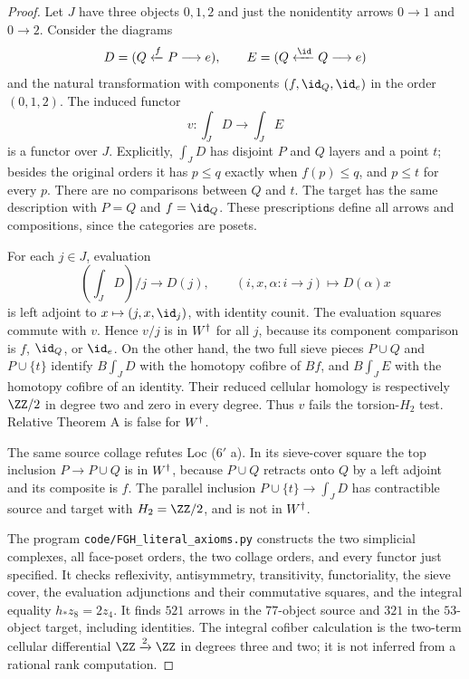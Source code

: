 \begin{proof}
Let $J$ have three objects $0,1,2$ and just the nonidentity arrows $0\to1$ and $0\to2$. Consider the diagrams
\[
 D=(Q\xleftarrow{f}P\longrightarrow e),
 \qquad E=(Q\xleftarrow{\id}Q\longrightarrow e)
\]
and the natural transformation with components $(f,\id_Q,\id_e)$ in the order $(0,1,2)$. The induced functor
\[
 v:\int_J D\longrightarrow\int_J E
\]
is a functor over $J$. Explicitly, $\int_JD$ has disjoint $P$ and $Q$ layers and a point $t$; besides the original orders it has $p\leq q$ exactly when $f(p)\leq q$, and $p\leq t$ for every $p$. There are no comparisons between $Q$ and $t$. The target has the same description with $P=Q$ and $f=\id_Q$. These prescriptions define all arrows and compositions, since the categories are posets.

For each $j\in J$, evaluation
\[
 (\int_JD)/j\longrightarrow D(j),
 \qquad (i,x,\alpha:i\to j)\longmapsto D(\alpha)x
\]
is left adjoint to $x\mapsto(j,x,\id_j)$, with identity counit. The evaluation squares commute with $v$. Hence $v/j$ is in ${W^{\dagger}}$ for all $j$, because its component comparison is $f$, $\id_Q$, or $\id_e$. On the other hand, the two full sieve pieces $P\cup Q$ and $P\cup\{t\}$ identify $B\int_JD$ with the homotopy cofibre of $Bf$, and $B\int_JE$ with the homotopy cofibre of an identity. Their reduced cellular homology is respectively $\ZZ/2$ in degree two and zero in every degree. Thus $v$ fails the torsion-$H_2$ test. Relative Theorem A is false for ${W^{\dagger}}$.

The same source collage refutes Loc ($6'$ a). In its sieve-cover square the top inclusion $P\to P\cup Q$ is in ${W^{\dagger}}$, because $P\cup Q$ retracts onto $Q$ by a left adjoint and its composite is $f$. The parallel inclusion $P\cup\{t\}\to\int_JD$ has contractible source and target with $H_2=\ZZ/2$, and is not in ${W^{\dagger}}$.

The program \texttt{code/FGH\_literal\_axioms.py} constructs the two simplicial complexes, all face-poset orders, the two collage orders, and every functor just specified. It checks reflexivity, antisymmetry, transitivity, functoriality, the sieve cover, the evaluation adjunctions and their commutative squares, and the integral equality $h_*z_8=2z_4$. It finds $521$ arrows in the $77$-object source and $321$ in the $53$-object target, including identities. The integral cofiber calculation is the two-term cellular differential $\ZZ\xrightarrow{2}\ZZ$ in degrees three and two; it is not inferred from a rational rank computation.


\end{proof}
